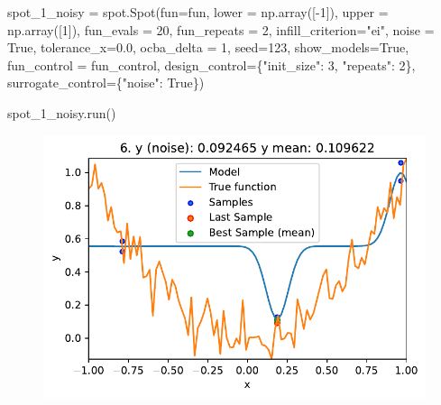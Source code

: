 \documentclass[
  letterpaper,
  DIV=11,
  numbers=noendperiod]{scrreprt}
\newenvironment{Shaded}{\begin{snugshade}}{\end{snugshade}}
\newcommand{\DecValTok}[1]{\textcolor[rgb]{0.68,0.00,0.00}{#1}}
\newcommand{\FloatTok}[1]{\textcolor[rgb]{0.68,0.00,0.00}{#1}}
\newcommand{\NormalTok}[1]{\textcolor[rgb]{0.00,0.23,0.31}{#1}}
\newcommand{\OperatorTok}[1]{\textcolor[rgb]{0.37,0.37,0.37}{#1}}
\newcommand{\StringTok}[1]{\textcolor[rgb]{0.13,0.47,0.30}{#1}}
\newcommand{\VariableTok}[1]{\textcolor[rgb]{0.07,0.07,0.07}{#1}}
\begin{document}
\begin{Shaded}
\begin{Highlighting}[]
\NormalTok{spot\_1\_noisy }\OperatorTok{=}\NormalTok{ spot.Spot(fun}\OperatorTok{=}\NormalTok{fun,}
\NormalTok{                   lower }\OperatorTok{=}\NormalTok{ np.array([}\OperatorTok{{-}}\DecValTok{1}\NormalTok{]),}
\NormalTok{                   upper }\OperatorTok{=}\NormalTok{ np.array([}\DecValTok{1}\NormalTok{]),}
\NormalTok{                   fun\_evals }\OperatorTok{=} \DecValTok{20}\NormalTok{,}
\NormalTok{                   fun\_repeats }\OperatorTok{=} \DecValTok{2}\NormalTok{,}
\NormalTok{                   infill\_criterion}\OperatorTok{=}\StringTok{"ei"}\NormalTok{,}
\NormalTok{                   noise }\OperatorTok{=} \VariableTok{True}\NormalTok{,}
\NormalTok{                   tolerance\_x}\OperatorTok{=}\FloatTok{0.0}\NormalTok{,}
\NormalTok{                   ocba\_delta }\OperatorTok{=} \DecValTok{1}\NormalTok{,}
\NormalTok{                   seed}\OperatorTok{=}\DecValTok{123}\NormalTok{,}
\NormalTok{                   show\_models}\OperatorTok{=}\VariableTok{True}\NormalTok{,}
\NormalTok{                   fun\_control }\OperatorTok{=}\NormalTok{ fun\_control,}
\NormalTok{                   design\_control}\OperatorTok{=}\NormalTok{\{}\StringTok{"init\_size"}\NormalTok{: }\DecValTok{3}\NormalTok{,}
                                   \StringTok{"repeats"}\NormalTok{: }\DecValTok{2}\NormalTok{\},}
\NormalTok{                   surrogate\_control}\OperatorTok{=}\NormalTok{\{}\StringTok{"noise"}\NormalTok{: }\VariableTok{True}\NormalTok{\})}
\end{Highlighting}
\end{Shaded}

\begin{Shaded}
\begin{Highlighting}[]
\NormalTok{spot\_1\_noisy.run()}
\end{Highlighting}
\end{Shaded}

\begin{figure}[H]

{\centering \includegraphics{09_spot_ocba_files/figure-pdf/cell-6-output-1.pdf}

}

\end{figure}
\end{document}
